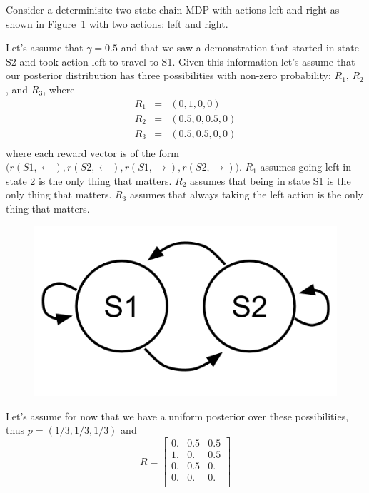 \documentclass{article}
\begin{document}
Consider a determinisitc two state chain MDP with actions left and right as shown in Figure~\ref{fig:two_state_mdp} with two actions: left and right.

Let's assume that $\gamma = 0.5$ and that we saw a demonstration that started in state S2 and took action left to travel to S1. Given this information let's assume that our posterior distribution has three possibilities with non-zero probability: $R_1$, $R_2$, and $R_3$, where
\begin{eqnarray}
  R_1 &=& (0, 1, 0, 0) \\
  R_2 &=& (0.5, 0, 0.5, 0)  \\ 
  R_3 &=& (0.5, 0.5, 0, 0) \\
\end{eqnarray}
where each reward vector is of the form $\big(r(S1, \leftarrow), r(S2,\leftarrow), r(S1, \rightarrow), r(S2, \rightarrow)\big)$. $R_1$ assumes going left in state 2 is the only thing that matters. $R_2$ assumes that being in state S1 is the only thing that matters. $R_3$ assumes that always taking the left action is the only thing that matters.

\begin{figure}
\centering
\includegraphics[scale=0.2]{./figs/chain_twostate.png}
\caption{}
\label{fig:two_state_mdp}
\end{figure}

Let's assume for now that we have a uniform posterior over these possibilities, thus $p= (1/3, 1/3, 1/3)$ and 
\begin{equation}
R = \begin{bmatrix}
0. &  0.5 & 0.5 \\
 1. & 0. & 0.5 \\
 0. & 0.5 & 0.  \\
 0. &  0. & 0. \\
\end{bmatrix}
\end{equation}
\end{document}
